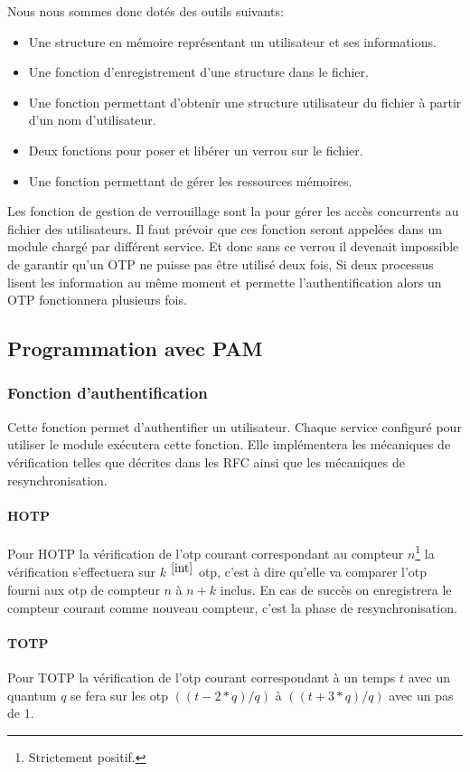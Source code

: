 Nous nous sommes donc dotés des outils suivants:
\begin{itemize}
  \item Une structure en mémoire représentant un utilisateur et ses 
  informations.
  \item Une fonction d'enregistrement d'une structure dans le fichier.
  \item Une fonction permettant d'obtenir une structure utilisateur du fichier 
  à partir d'un nom d'utilisateur.
  \item Deux fonctions pour poser et libérer un verrou sur le fichier.
  \item Une fonction permettant de gérer les ressources mémoires.\\
\end{itemize}

Les fonction de gestion de verrouillage sont la pour gérer les accès concurrents 
au fichier des utilisateurs. Il faut prévoir que ces fonction seront appelées 
dans un module chargé par différent service. Et donc sans ce verrou il devenait 
impossible de garantir qu'un OTP ne puisse pas être utilisé deux fois, Si deux 
processus lisent les information au même moment et permette l'authentification 
alors un OTP fonctionnera plusieurs fois.

\subsection{Programmation avec PAM}
\subsubsection{Fonction d'authentification}
Cette fonction permet d'authentifier un utilisateur. Chaque service configuré
pour utiliser le module exécutera cette fonction. Elle implémentera les 
mécaniques de vérification telles que décrites dans les RFC ainsi que les 
mécaniques de resynchronisation.
\paragraph{HOTP}
Pour HOTP la vérification de l'otp courant correspondant au compteur 
$n$\footnote{Strictement positif.\label{int}} la vérification s'effectuera sur 
$k$ $^{\ref{int}}$ otp, c'est à dire qu'elle va comparer l'otp fourni aux otp de 
compteur $n$ à $n+k$ inclus. En cas de succès on enregistrera le compteur 
courant comme nouveau compteur, c'est la phase de resynchronisation.
\paragraph{TOTP}
Pour TOTP la vérification de l'otp courant correspondant à un temps $t$ avec un 
quantum $q$ se fera sur les otp $((t - 2 * q) / q) $ à $((t + 3 * q) / q) $ avec un 
pas de $1$.

